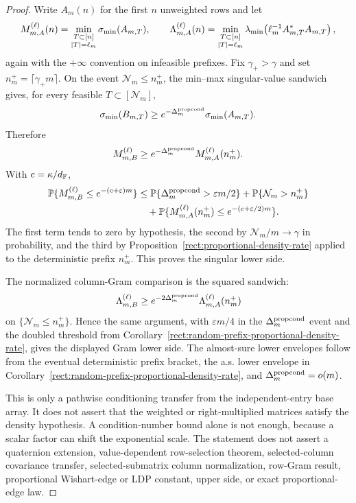 \begin{proof}
Write \(A_m(n)\) for the first \(n\) unweighted rows and let
\[
  M_{m,A}^{(\ell)}(n)
  =
  \min_{\substack{T\subset[n]\\ |T|=\ell_m}}\sigma_{\min}(A_{m,T}),
  \qquad
  \Lambda_{m,A}^{(\ell)}(n)
  =
  \min_{\substack{T\subset[n]\\ |T|=\ell_m}}
  \lambda_{\min}\!\left(\ell_m^{-1}A_{m,T}^*A_{m,T}\right),
\]
again with the \(+\infty\) convention on infeasible prefixes.  Fix
\(\gamma_+>\gamma\) and set \(n_m^+=\lceil\gamma_+m\rceil\).  On the event
\(\mathcal N_m\le n_m^+\), the min--max singular-value sandwich gives, for
every feasible \(T\subset[\mathcal N_m]\),
\[
  \sigma_{\min}(B_{m,T})
  \ge e^{-\Delta_m^{\rm propcond}}\sigma_{\min}(A_{m,T}).
\]
Therefore
\[
  M_{m,B}^{(\ell)}
  \ge e^{-\Delta_m^{\rm propcond}}M_{m,A}^{(\ell)}(n_m^+).
\]
With \(c=\kappa/d_{\mathbb{F}}\),
\[
\begin{aligned}
  \mathbb{P}\{M_{m,B}^{(\ell)}\le e^{-(c+\varepsilon)m}\}
  &\le
  \mathbb{P}\{\Delta_m^{\rm propcond}>\varepsilon m/2\}
  +\mathbb{P}\{\mathcal N_m>n_m^+\} \\
  &\quad
  +\mathbb{P}\{M_{m,A}^{(\ell)}(n_m^+)\le e^{-(c+\varepsilon/2)m}\}.
\end{aligned}
\]
The first term tends to zero by hypothesis, the second by
\(\mathcal N_m/m\to\gamma\) in probability, and the third by
Proposition~\ref{rect:proportional-density-rate} applied to the deterministic
prefix \(n_m^+\).  This proves the singular lower side.

The normalized column-Gram comparison is the squared sandwich:
\[
  \Lambda_{m,B}^{(\ell)}
  \ge
  e^{-2\Delta_m^{\rm propcond}}\Lambda_{m,A}^{(\ell)}(n_m^+)
\]
on \(\{\mathcal N_m\le n_m^+\}\).  Hence the same argument, with
\(\varepsilon m/4\) in the \(\Delta_m^{\rm propcond}\) event and the doubled
threshold from Corollary~\ref{rect:random-prefix-proportional-density-rate},
gives the displayed Gram lower side.  The almost-sure lower envelopes follow
from the eventual deterministic prefix bracket, the a.s. lower envelope in
Corollary~\ref{rect:random-prefix-proportional-density-rate}, and
\(\Delta_m^{\rm propcond}=o(m)\).

This is only a pathwise conditioning transfer from the independent-entry base
array.  It does not assert that the weighted or right-multiplied matrices
satisfy the density hypothesis.  A condition-number bound alone is not enough,
because a scalar factor can shift the exponential scale.  The statement does
not assert a quaternion extension, value-dependent row-selection theorem,
selected-column covariance transfer, selected-submatrix column normalization,
row-Gram result, proportional Wishart-edge or LDP constant, upper side, or exact
proportional-edge law.
\end{proof}

